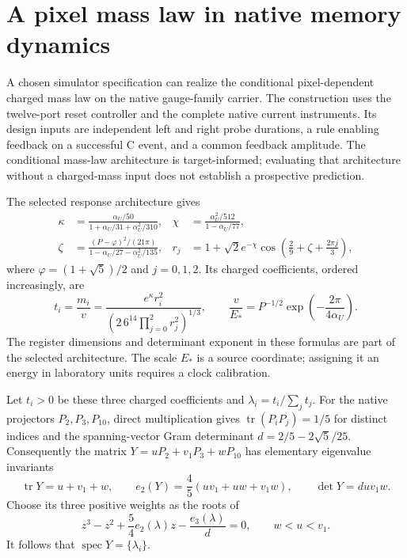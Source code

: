 \section{A pixel mass law in native memory dynamics}
\label{sec:mcpr-native-memory}

A chosen simulator specification can realize the conditional pixel-dependent
charged mass law on the native gauge-family carrier. The construction uses
the twelve-port reset controller and the complete native current instruments.
Its design inputs are independent left and right probe durations, a rule
enabling feedback on a successful C event, and a common feedback amplitude.
The conditional mass-law architecture is target-informed; evaluating that
architecture without a charged-mass input does not establish a prospective
prediction.

The selected response architecture gives
\begin{align}
 \kappa&=\frac{\alpha_U/50}{1+\alpha_U/31+\alpha_U^2/310},&
 \chi&=\frac{\alpha_U^2/512}{1-\alpha_U/77},\\
 \zeta&=\frac{(P-\varphi)^2/(21\pi)}{1-\alpha_U/27-\alpha_U^2/135},&
 r_j&=1+\sqrt2 e^{-\chi}
       \cos\left(\frac29+\zeta+\frac{2\pi j}{3}\right),
\end{align}
where $\varphi=(1+\sqrt5)/2$ and $j=0,1,2$.
Its charged coefficients, ordered increasingly, are
\begin{equation}
 t_i=\frac{m_i}{v}
     =\frac{e^\kappa r_i^2}
      {\left(2\,6^{14}\prod_{j=0}^{2}r_j^2\right)^{1/3}},
 \qquad \frac v{E_*}=P^{-1/2}
       \exp\left(-\frac{2\pi}{4\alpha_U}\right).
\end{equation}
The register dimensions and determinant exponent in these formulas are
part of the selected architecture. The scale $E_*$ is a source coordinate;
assigning it an energy in laboratory units requires a clock calibration.

Let $t_i>0$ be these three charged coefficients and
$\lambda_i=t_i/\sum_jt_j$. For the native projectors $P_2,P_3,P_{10}$,
direct multiplication gives $\operatorname{tr}(P_iP_j)=1/5$ for distinct
indices and the spanning-vector Gram determinant
$d=2/5-2\sqrt5/25$. Consequently the matrix
$Y=uP_2+v_1P_3+wP_{10}$ has elementary eigenvalue invariants
\begin{equation}
 \operatorname{tr}Y=u+v_1+w,\qquad
 e_2(Y)=\frac45(uv_1+uw+v_1w),\qquad
 \det Y=d uv_1w.
\end{equation}
Choose its three positive weights as the roots of
\begin{equation}
 z^3-z^2+\frac54e_2(\lambda)z-\frac{e_3(\lambda)}d=0,
 \qquad w<u<v_1.
 \label{eq:memory-shape-cubic}
\end{equation}
It follows that $\operatorname{spec}Y=\{\lambda_i\}$.

